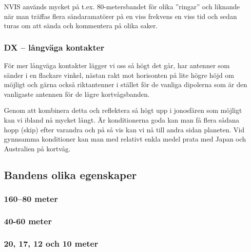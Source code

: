 NVIS används mycket på t.ex. 80-metersbandet för olika ''ringar'' och liknande när man träffas flera sändaramatörer på en viss frekvens en viss tid och sedan turas om att sända och kommentera på olika saker. 

\subsubsection{DX -- långväga kontakter}

För mer långväga kontakter lägger vi oss så högt det går, har antenner som sänder i en flackare vinkel, nästan rakt mot horisonten på lite högre höjd om möjligt och gärna också riktantenner i stället för de vanliga dipolerna som är den vanligaste antennen för de lägre kortvågsbanden.

Genom att kombinera detta och reflektera så högt upp i jonosfären som möjligt kan vi ibland nå mycket långt. Är konditionerna goda kan man få flera sådana hopp (skip) efter varandra och på så vis kan vi nå till andra sidan planeten. Vid gynnsamma konditioner kan man med relativt enkla medel prata med Japan och Australien på kortvåg.

\subsection{Bandens olika egenskaper}


\subsubsection{160--80 meter}


\subsubsection{40-60 meter}

\subsubsection{20, 17, 12 och 10 meter}

